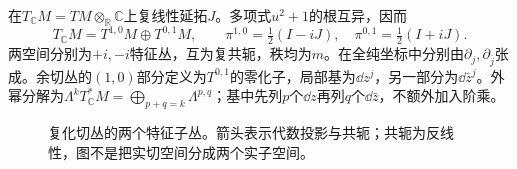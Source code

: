 在$T_{\mathbb C}M=TM\otimes_{\mathbb R}\mathbb C$上复线性延拓$J$。多项式$u^2+1$的根互异，因而
\begin{equation}\label{eq:complex-projections}
 T_{\mathbb C}M=T^{1,0}M\oplus T^{0,1}M,\qquad
 \pi^{1,0}=\tfrac12(I-iJ),\quad\pi^{0,1}=\tfrac12(I+iJ).
\end{equation}
两空间分别为$+i,-i$特征丛，互为复共轭，秩均为$m$。在全纯坐标中分别由$\partial_j,\partial_{\bar j}$张成。余切丛的$(1,0)$部分定义为$T^{0,1}$的零化子，局部基为$\dd z^j$，另一部分为$\dd\bar z^j$。外幂分解为$\Lambda^kT^*_{\mathbb C}M=\bigoplus_{p+q=k}\Lambda^{p,q}$；基中先列$p$个$\dd z$再列$q$个$\dd\bar z$，不额外加入阶乘。

\begin{figure}[htbp]
\centering
\caption{复化切丛的两个特征子丛。箭头表示代数投影与共轭；共轭为反线性，图不是把实切空间分成两个实子空间。}
\label{fig:complex-types}
\end{figure}
